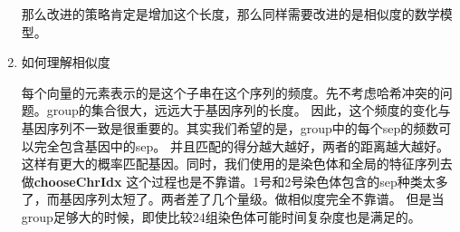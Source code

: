 \documentclass[hyperref,UTF8]{ctexart}
\theoremstyle{definition}
\theoremstyle{remark}
\numberwithin{equation}{subsection}
\newcommand{\Emph}{\textbf}
\begin{document}
\begin{enumerate}
		那么改进的策略肯定是增加这个长度，那么同样需要改进的是相似度的数学模型。

		\item 如何理解相似度

		每个向量的元素表示的是这个子串在这个序列的频度。先不考虑哈希冲突的问题。group的集合很大，远远大于基因序列的长度。
		因此，这个频度的变化与基因序列不一致是很重要的。其实我们希望的是，group中的每个sep的频数可以完全包含基因中的sep。
		并且匹配的得分越大越好，两者的距离越大越好。这样有更大的概率匹配基因。同时，我们使用的是染色体和全局的特征序列去做\Emph{chooseChrIdx}
		这个过程也是不靠谱。1号和2号染色体包含的sep种类太多了，而基因序列太短了。两者差了几个量级。做相似度完全不靠谱。
		但是当group足够大的时候，即使比较24组染色体可能时间复杂度也是满足的。

	\end{enumerate}
	
	
\end{document}

